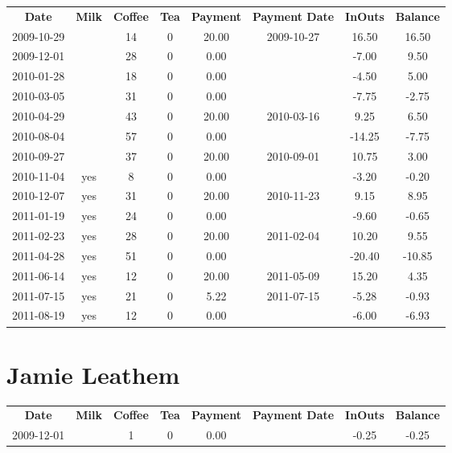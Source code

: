 \begin{center}
\begin{tabular}{cccccccc}
\textbf{Date} & \textbf{Milk} & \textbf{Coffee} & \textbf{Tea} & \textbf{Payment} & \textbf{Payment Date} & \textbf{InOuts} & \textbf{Balance} \\
2009-10-29 &  & 14 & 0 & 20.00 & 2009-10-27 &  16.50 &  16.50\\ 
2009-12-01 &  & 28 & 0 &  0.00 &  &  -7.00 &   9.50\\ 
2010-01-28 &  & 18 & 0 &  0.00 &  &  -4.50 &   5.00\\ 
2010-03-05 &  & 31 & 0 &  0.00 &  &  -7.75 &  -2.75\\ 
2010-04-29 &  & 43 & 0 & 20.00 & 2010-03-16 &   9.25 &   6.50\\ 
2010-08-04 &  & 57 & 0 &  0.00 &  & -14.25 &  -7.75\\ 
2010-09-27 &  & 37 & 0 & 20.00 & 2010-09-01 &  10.75 &   3.00\\ 
2010-11-04 & yes &  8 & 0 &  0.00 &  &  -3.20 &  -0.20\\ 
2010-12-07 & yes & 31 & 0 & 20.00 & 2010-11-23 &   9.15 &   8.95\\ 
2011-01-19 & yes & 24 & 0 &  0.00 &  &  -9.60 &  -0.65\\ 
2011-02-23 & yes & 28 & 0 & 20.00 & 2011-02-04 &  10.20 &   9.55\\ 
2011-04-28 & yes & 51 & 0 &  0.00 &  & -20.40 & -10.85\\ 
2011-06-14 & yes & 12 & 0 & 20.00 & 2011-05-09 &  15.20 &   4.35\\ 
2011-07-15 & yes & 21 & 0 &  5.22 & 2011-07-15 &  -5.28 &  -0.93\\ 
2011-08-19 & yes & 12 & 0 &  0.00 &  &  -6.00 &  -6.93
\end{tabular}
\end{center}

\section{Jamie Leathem}

\begin{center}
\begin{tabular}{cccccccc}
\textbf{Date} & \textbf{Milk} & \textbf{Coffee} & \textbf{Tea} & \textbf{Payment} & \textbf{Payment Date} & \textbf{InOuts} & \textbf{Balance} \\
2009-12-01 &  & 1 & 0 & 0.00 &  & -0.25 & -0.25
\end{tabular}
\end{center}

